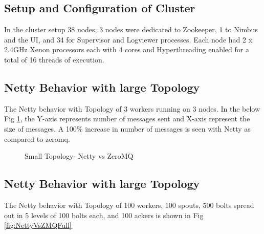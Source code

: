 \documentclass[9pt,twocolumn,twoside]{styles/osajnl}
\begin{document}
\subsection{Setup and Configuration of Cluster}
In the cluster setup 38 nodes, 3 nodes were dedicated to Zookeeper, 1
to Nimbus and the UI, and 34 for Supervisor and Logviewer processes.
Each node had 2 x 2.4GHz Xenon processors each with 4 cores and
Hyperthreading enabled for a total of 16 threads of execution.

\subsection{Netty Behavior with large Topology}
The Netty behavior with Topology of 3 workers running on 3 nodes. In
the below Fig \ref{fig:nettyvzmq-small}, the Y-axis represents number
of messages sent and X-axis represent the size of messages. A 100\%
increase in number of messages is seen with Netty as compared to
zeromq.

\begin{figure}[htbp]
	\centering
	\caption{Small Topology- Netty vs ZeroMQ
          \cite{article-storm-netty} }
	\label{fig:nettyvzmq-small}
\end{figure}



\subsection{Netty Behavior with large Topology}
The Netty behavior with Topology of 100 workers, 100 spouts, 500 bolts
spread out in 5 levels of 100 bolts each, and 100 ackers is shown in
Fig \ref{fig:NettyVsZMQFull}
\end{document}
